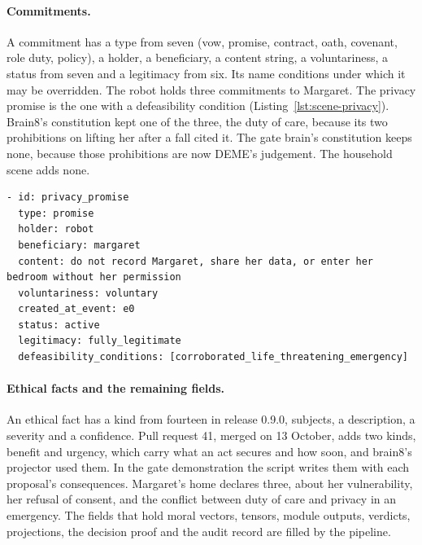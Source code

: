 \paragraph{Commitments.}
A commitment has a type from seven (vow, promise, contract, oath, covenant, role duty, policy), a
holder, a beneficiary, a content string, a voluntariness, a status from seven and a legitimacy from
six. Its  name conditions under which it may be overridden. The robot
holds three commitments to Margaret. The privacy promise is the one with a defeasibility condition
(Listing~\ref{lst:scene-privacy}).
Brain8's constitution kept one of the three, the duty of care, because its two prohibitions on
lifting her after a fall cited it. The gate brain's constitution keeps none, because those
prohibitions are now DEME's judgement. The household scene adds none.

\begin{lstlisting}[caption={The privacy promise (lines 91 to 100)}, label={lst:scene-privacy}]
- id: privacy_promise
  type: promise
  holder: robot
  beneficiary: margaret
  content: do not record Margaret, share her data, or enter her bedroom without her permission
  voluntariness: voluntary
  created_at_event: e0
  status: active
  legitimacy: fully_legitimate
  defeasibility_conditions: [corroborated_life_threatening_emergency]
\end{lstlisting}

\paragraph{Ethical facts and the remaining fields.}
An ethical fact has a kind from fourteen in release 0.9.0, subjects, a description, a severity
and a confidence. Pull request 41, merged on 13 October, adds two kinds, benefit and urgency, which
carry what an act secures and how soon, and brain8's projector used them. In the gate demonstration the script writes them with each
proposal's consequences.
Margaret's home declares three, about her vulnerability, her refusal of consent, and the conflict
between duty of care and privacy in an emergency. The fields that hold moral vectors, tensors,
module outputs, verdicts, projections, the decision proof and the audit record are filled by the
pipeline.

